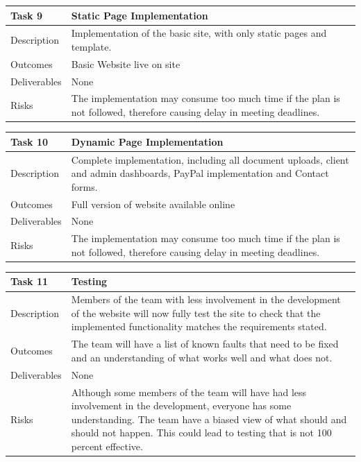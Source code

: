 \documentclass{l3proj}
\begin{document}
\begin{center}
    \begin{tabular}{ | l | p{12cm} |}
    \hline	
    Task 9 & Static Page Implementation \\ \hline
    Description & Implementation of the basic site, with only static pages and template. \\ \hline   
    Outcomes & Basic Website live on site \\ \hline
    Deliverables & None \\ \hline
    Risks & The implementation may consume too much time if the plan is not followed, therefore causing delay in meeting deadlines. \\ 
    \hline
    \end{tabular}
\end{center}

\begin{center}
    \begin{tabular}{ | l | p{12cm} |}
    \hline	
    Task 10 & Dynamic Page Implementation \\ \hline
    Description & Complete implementation, including all document uploads, client and admin dashboards, PayPal implementation and Contact forms. \\ \hline   
    Outcomes & Full version of website available online \\ \hline
    Deliverables & None \\ \hline
    Risks & The implementation may consume too much time if the plan is not followed, therefore causing delay in meeting deadlines. \\ 
    \hline
    \end{tabular}
\end{center}

\begin{center}
    \begin{tabular}{ | l | p{12cm} |}
    \hline	
    Task 11 & Testing \\ \hline
    Description & Members of the team with less involvement in the development of the website will now fully test the site to check that the implemented functionality matches the requirements stated. \\ \hline   
    Outcomes & The team will have a list of known faults that need to be fixed and an understanding of what works well and what does not. \\ \hline
    Deliverables & None \\ \hline
    Risks & Although some members of the team will have had less involvement in the development, everyone has some understanding. The team have a biased view of what should and should not happen. This could lead to testing that is not 100 percent effective. \\ 
    \hline
    \end{tabular}
\end{center}
\end{document}
